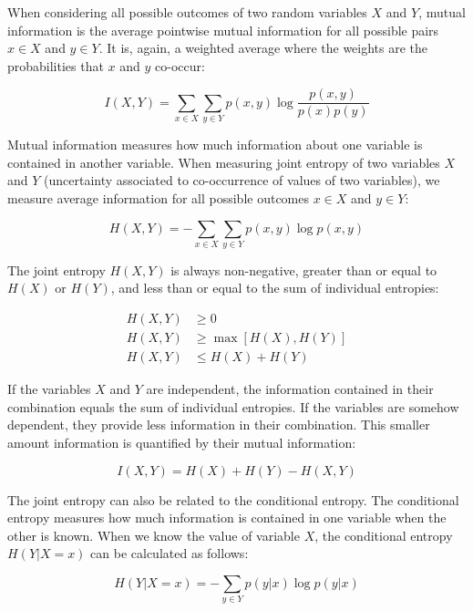 \documentclass[11pt,openany,executivepaper]{book}
\begin{document}
When considering all possible outcomes of two random variables $X$ and $Y$, mutual information is the average pointwise mutual information for all possible pairs $x \in X$ and $y \in Y$. It is, again, a weighted average where the weights are the probabilities that $x$ and $y$ co-occur:

\begin{equation}
    I(X,Y) = \sum_{x \in X} \sum_{y \in Y} p(x,y) \log \frac{p(x,y)}{p(x)p(y)}
\end{equation}

Mutual information measures how much information about one variable is contained in another variable.
When measuring joint entropy of two variables $X$ and $Y$ (uncertainty associated to co-occurrence of values of two variables), we measure average information for all possible outcomes $x \in X$ and $y \in Y$:

\begin{equation}
    H(X,Y) = - \sum_{x \in X} \sum_{y \in Y} p(x,y) \log p(x,y)
\end{equation}

The joint entropy $H(X,Y)$ is always non-negative, greater than or equal to $H(X)$ or $H(Y)$, and less than or equal to the sum of individual entropies:

\begin{equation}
\begin{split}
    H(X,Y) &\ge 0 \\
    H(X,Y) &\ge \max[H(X),H(Y)] \\
    H(X,Y) &\le H(X) + H(Y)
\end{split}
\end{equation}

If the variables $X$ and $Y$ are independent, the information contained in their combination equals the sum of individual entropies. If the variables are somehow dependent, they provide less information in their combination. This smaller amount information is quantified by their mutual information:

\begin{equation}
    I(X,Y) = H(X) + H(Y) - H(X,Y)
\end{equation}

The joint entropy can also be related to the conditional entropy. The conditional entropy measures how much information is contained in one variable when the other is known. When we know the value of variable $X$, the conditional entropy $H(Y|X=x)$ can be calculated as follows:

\begin{equation}
    H(Y|X=x) = - \sum_{y \in Y} p(y|x) \log p(y|x)
\end{equation}
\end{document}
